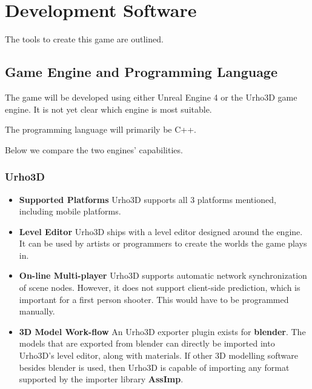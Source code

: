 \section{Development Software}

The tools to create this game are outlined.


\subsection{Game Engine and Programming Language}

The  game  will  be  developed  using either Unreal Engine 4 or the Urho3D  game
engine. It is not yet clear which engine is most suitable. 

The programming language will primarily be C++.

Below we compare the two engines' capabilities.

\subsubsection*{Urho3D}
\begin{itemize}
    \item \textbf{Supported Platforms}
        Urho3D supports all 3 platforms mentioned, including mobile platforms.
    \item \textbf{Level Editor}
        Urho3D ships with a level editor designed around  the  engine. It can be used by
        artists or programmers to create the worlds the game plays in.
    \item \textbf{On-line Multi-player}
        Urho3D  supports  automatic network synchronization of scene nodes. However,  it
        does not support  client-side  prediction, which is important for a first person
        shooter. This would have to be programmed manually.
    \item \textbf{3D Model Work-flow}
        An  Urho3D  exporter  plugin  exists  for  \textbf{blender}. The models that are
        exported from blender can directly be imported into Urho3D's level editor, along
        with materials. If other 3D modelling  software  besides  blender  is used, then
        Urho3D  is  capable  of  importing  any format supported by the importer library
        \textbf{AssImp}.
\end{itemize}


